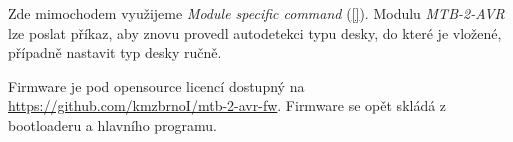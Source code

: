 Zde mimochodem využijeme \textit{Module specific command} (\ref{}). Modulu
\textit{MTB-2-AVR} lze poslat příkaz, aby znovu provedl autodetekci typu
desky, do které je vložené, případně nastavit typ desky ručně.

Firmware je pod opensource licencí dostupný na
\url{https://github.com/kmzbrnoI/mtb-2-avr-fw}. Firmware se opět skládá
z bootloaderu a hlavního programu.
